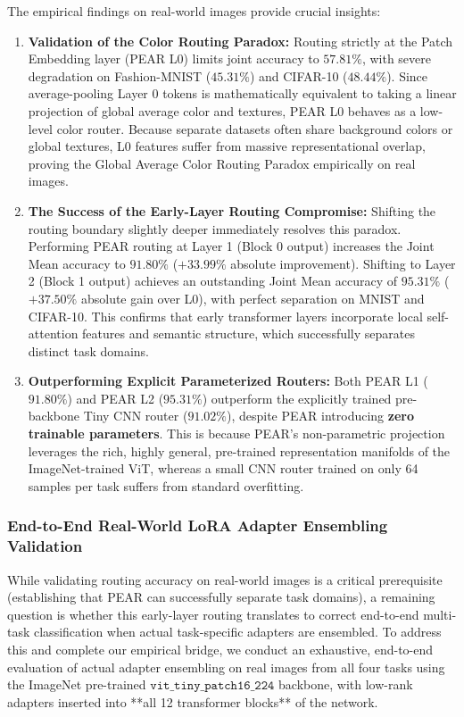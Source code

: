 The empirical findings on real-world images provide crucial insights:
\begin{enumerate}
    \item \textbf{Validation of the Color Routing Paradox:} Routing strictly at the Patch Embedding layer (PEAR L0) limits joint accuracy to $57.81\%$, with severe degradation on Fashion-MNIST ($45.31\%$) and CIFAR-10 ($48.44\%$). Since average-pooling Layer 0 tokens is mathematically equivalent to taking a linear projection of global average color and textures, PEAR L0 behaves as a low-level color router. Because separate datasets often share background colors or global textures, L0 features suffer from massive representational overlap, proving the Global Average Color Routing Paradox empirically on real images.
    \item \textbf{The Success of the Early-Layer Routing Compromise:} Shifting the routing boundary slightly deeper immediately resolves this paradox. Performing PEAR routing at Layer 1 (Block 0 output) increases the Joint Mean accuracy to $\mathbf{91.80\%}$ ($+33.99\%$ absolute improvement). Shifting to Layer 2 (Block 1 output) achieves an outstanding Joint Mean accuracy of $\mathbf{95.31\%}$ ($+37.50\%$ absolute gain over L0), with perfect separation on MNIST and CIFAR-10. This confirms that early transformer layers incorporate local self-attention features and semantic structure, which successfully separates distinct task domains.
    \item \textbf{Outperforming Explicit Parameterized Routers:} Both PEAR L1 ($91.80\%$) and PEAR L2 ($95.31\%$) outperform the explicitly trained pre-backbone Tiny CNN router ($91.02\%$), despite PEAR introducing \textbf{zero trainable parameters}. This is because PEAR's non-parametric projection leverages the rich, highly general, pre-trained representation manifolds of the ImageNet-trained ViT, whereas a small CNN router trained on only 64 samples per task suffers from standard overfitting.
\end{enumerate}

\subsubsection{End-to-End Real-World LoRA Adapter Ensembling Validation}
While validating routing accuracy on real-world images is a critical prerequisite (establishing that PEAR can successfully separate task domains), a remaining question is whether this early-layer routing translates to correct end-to-end multi-task classification when actual task-specific adapters are ensembled. To address this and complete our empirical bridge, we conduct an exhaustive, end-to-end evaluation of actual adapter ensembling on real images from all four tasks using the ImageNet pre-trained $\mathtt{vit\_tiny\_patch16\_224}$ backbone, with low-rank adapters inserted into **all 12 transformer blocks** of the network.

